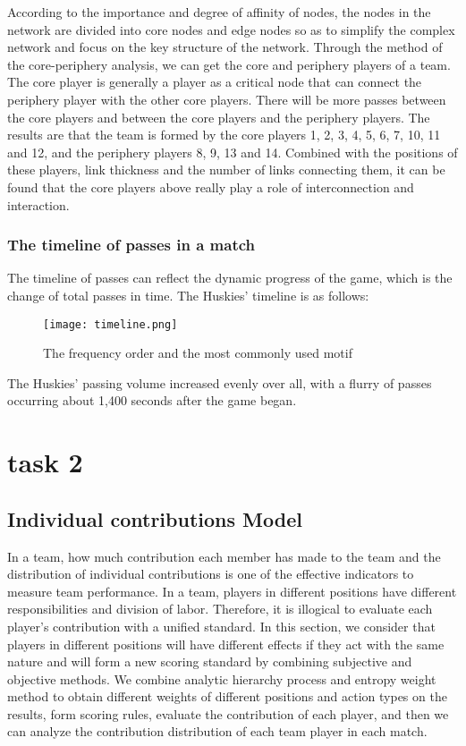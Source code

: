 \documentclass{mcmthesis}
\begin{document}
According to the importance and degree of affinity of nodes, the nodes in the network are
divided into core nodes and edge nodes so as to simplify the complex network and focus on
the key structure of the network. Through the method of the core-periphery analysis, we can
get the core and periphery players of a team. The core player is generally a player as a critical
node that can connect the periphery player with the other core players. There will be more
passes between the core players and between the core players and the periphery players.
The results are that the team is formed by the core players 1, 2, 3, 4, 5, 6, 7, 10, 11 and 12,
and the periphery players 8, 9, 13 and 14. Combined with the positions of these players, link
thickness and the number of links connecting them, it can be found that the core players
above really play a role of interconnection and interaction.

\subsubsection{The timeline of passes in a match}
The timeline of passes can reflect the dynamic progress of the game, which is the change of
total passes in time. The Huskies' timeline is as follows:

\begin{figure}
        \centering
        \texttt{[image: timeline.png]}
        \caption{The frequency order and the most commonly used motif}
\end{figure}

The Huskies' passing volume increased evenly over all, with a flurry of passes occurring about
1,400 seconds after the game began.

\section{task 2}
\subsection{Individual contributions Model}
In a team, how much contribution each member has made to the team and the
distribution of individual contributions is one of the effective indicators to measure
team performance. In a team, players in different positions have different
responsibilities and division of labor. Therefore, it is illogical to evaluate each player's
contribution with a unified standard. In this section, we consider that players in
different positions will have different effects if they act with the same nature and will
form a new scoring standard by combining subjective and objective methods. We
combine analytic hierarchy process and entropy weight method to obtain different
weights of different positions and action types on the results, form scoring rules,
evaluate the contribution of each player, and then we can analyze the contribution
distribution of each team player in each match.
\end{document}
